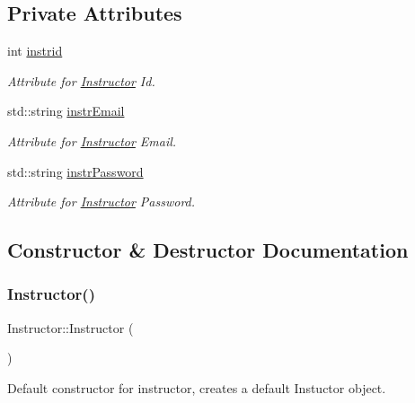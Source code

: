 \subsection*{Private Attributes}
\begin{DoxyCompactItemize}
\item 
int \hyperlink{class_instructor_a4dde1d72f984b0530250cde154c66d96}{instrid}
\begin{DoxyCompactList}\small\item\em Attribute for \hyperlink{class_instructor}{Instructor} Id. \end{DoxyCompactList}\item 
std\+::string \hyperlink{class_instructor_aa32f70770889ea70fd9e37b176b3d35a}{instr\+Email}
\begin{DoxyCompactList}\small\item\em Attribute for \hyperlink{class_instructor}{Instructor} Email. \end{DoxyCompactList}\item 
std\+::string \hyperlink{class_instructor_aa2550f7fbea278158c928f86c7fc420f}{instr\+Password}
\begin{DoxyCompactList}\small\item\em Attribute for \hyperlink{class_instructor}{Instructor} Password. \end{DoxyCompactList}\end{DoxyCompactItemize}


\subsection{Constructor \& Destructor Documentation}
\mbox{\label{class_instructor_a7e4414cdb058703970bbcecf3a97046e}} 
\subsubsection{\texorpdfstring{Instructor()}{Instructor()}}
{\footnotesize\ttfamily Instructor\+::\+Instructor (\begin{DoxyParamCaption}{ }\end{DoxyParamCaption})}



Default constructor for instructor, creates a default Instuctor object. 

\mbox{\label{class_instructor_aa204bec2066fabdd81a065999b01816c}} 
